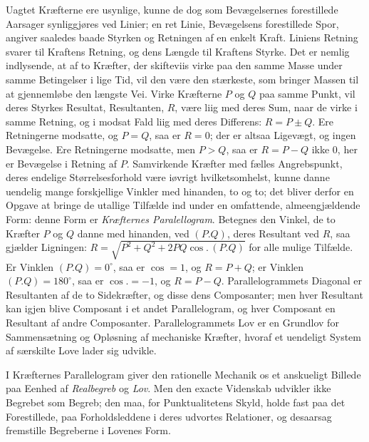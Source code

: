 \documentclass[12pt]{book}
\newcommand{\apage}[1]{\marginnote{\footnotesize\textit{[#1]}}}
\begin{document}
Uagtet Kræfterne ere usynlige, kunne de dog som Bevægelsernes forestillede
Aarsager synliggjøres ved Linier; en ret Linie, Bevægelsens forestillede
Spor, angiver saaledes baade Styrken og Retningen af en enkelt Kraft.
Liniens Retning svarer til Kraftens Retning, og dens Længde til Kraftens
Styrke. Det er nemlig indlysende, at af to Kræfter, der skifteviis virke
paa den samme Masse under samme Betingelser i lige Tid, vil den være den
stærkeste, som bringer Massen til at gjennemløbe den længste Vei. Virke
Kræfterne $P$ og $Q$ paa samme Punkt, vil deres Styrkes Resultat,
Resultanten, $R$, være liig med deres Sum, naar de virke i samme Retning,
og i modsat Fald liig med deres Differens: $R = P \pm Q$. Ere Retningerne
modsatte, og $P = Q$, saa er $R = 0$; der er altsaa Ligevægt, og ingen
Bevægelse. Ere Retningerne modsatte, men $P > Q$, saa er $R = P - Q$ ikke
$0$, her er Bevægelse i Retning af $P$. Samvirkende Kræfter med fælles
Angrebspunkt, deres endelige Størrelsesforhold være iøvrigt
hvilketsomhelst, kunne danne uendelig mange forskjellige Vinkler med
hinanden, to og to; det bliver derfor en Opgave at bringe de utallige
Tilfælde ind under en omfattende, almeengjældende Form: denne Form er
\emph{Kræfternes Paralellogram}. Betegnes den Vinkel, de to Kræfter $P$ og $Q$
danne med hinanden, ved $(P.Q)$, deres Resultant ved $R$, saa gjælder
Ligningen: $R = \sqrt{P^2 + Q^2 + 2PQ\cos.\,(P.Q)}$ for alle mulige Tilfælde.
Er Vinklen $(P.Q) = 0^\circ$, saa \apage{127} er $\cos = 1$, og $R = P + Q$; er Vinklen
$(P.Q) = 180^\circ$, saa er $\cos. = -1$, og $R = P - Q$. Parallelogrammets
Diagonal er Resultanten af de to Sidekræfter, og disse dens Composanter;
men hver Resultant kan igjen blive Composant i et andet Parallelogram, og
hver Composant en Resultant af andre Composanter. Parallelogrammets Lov er
en Grundlov for Sammensætning og Opløsning af mechaniske Kræfter, hvoraf et
uendeligt System af særskilte Love lader sig udvikle.

I Kræfternes Parallelogram giver den rationelle Mechanik os et anskueligt
Billede paa Eenhed af \emph{Realbegreb} og \emph{Lov}. Men den exacte Videnskab udvikler
ikke Begrebet som Begreb; den maa, for Punktualitetens Skyld, holde fast
paa det Forestillede, paa Forholdsleddene i deres udvortes Relationer, og
desaarsag fremstille Begreberne i Lovenes Form.
\end{document}
